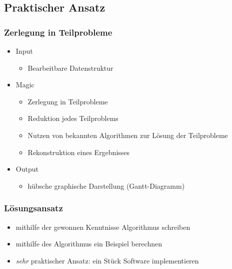 \documentclass[%
]{beamer}
\begin{document}
	\subsection{Praktischer Ansatz}
		\begin{frame}
			\frametitle{Zerlegung in Teilprobleme}
			\pause
			\begin{itemize}
				\item Input
					\begin{itemize}
						\item Bearbeitbare Datenstruktur
					\end{itemize}\pause
				\item Magic
					\begin{itemize}
						\item Zerlegung in Teilprobleme
						\item Reduktion jedes Teilproblems
						\item Nutzen von bekannten Algorithmen zur Lösung der Teilprobleme
						\item Rekonstruktion eines Ergebnisses
					\end{itemize}\pause
				\item Output
					\begin{itemize}
						\item hübsche graphische Darstellung (Gantt-Diagramm)
					\end{itemize}
			\end{itemize}
		\end{frame}
		\begin{frame}
			\frametitle{Lösungsansatz}
			\begin{itemize}
				\item mithilfe der gewonnen Kenntnisse Algorithmus schreiben
				\item mithilfe des Algorithmus ein Beispiel berechnen
				\item \textit{sehr} praktischer Ansatz: ein Stück Software implementieren
			\end{itemize}
		\end{frame}
\end{document}
